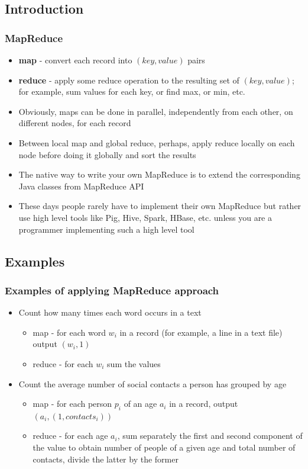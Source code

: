 \documentclass{beamer}
\begin{document}
\subsection{Introduction}
\begin{frame}
 \frametitle{MapReduce}
 \begin{itemize}
  \item {\color{mycolordef}\textbf{map}} - convert each record into $(key, value)$ pairs
  \item {\color{mycolordef}\textbf{reduce}} - apply some reduce operation to the resulting set of $(key, value)$; for example, sum values for each key, or find max, or min, etc.
  \item Obviously, maps can be done in parallel, independently from each other, on different nodes, for each record
  \item Between local map and global reduce, perhaps, apply reduce locally on each node before doing it globally and sort the results
  \item The native way to write your own MapReduce is to extend the corresponding Java classes from MapReduce API
  \item These days people rarely have to implement their own MapReduce but rather use high level tools like Pig, Hive, Spark, HBase, etc. unless you 
    are a programmer implementing such a high level tool
  \end{itemize}
\end{frame}

\subsection{Examples}
\begin{frame}
  \frametitle{Examples of applying MapReduce approach}
  \begin{itemize}
  \item {\color{mycolordef}Count how many times each word occurs in a text}
    \begin{itemize}
      \item map - for each word {\color{mycolorcode}$w_i$} in a record (for example, a line in a text file) output {\color{mycolorcode}$(w_i,1)$}
      \item reduce - for each {\color{mycolorcode}$w_i$} sum the values
    \end{itemize}
  \item {\color{mycolordef}Count the average number of social contacts a person has grouped by age}
    \begin{itemize}
    \item map - for each person {\color{mycolorcode}$p_i$}  of an age {\color{mycolorcode}$a_i$} in a record, output {\color{mycolorcode}$(a_i, (1, contacts_i))$}
    \item reduce - for each age {\color{mycolorcode}$a_i$}, sum separately the first and second component of the value to obtain number 
      of people of a given age and total number of contacts, divide the latter by the former
    \end{itemize}
  \end{itemize}
\end{frame}
\end{document}
